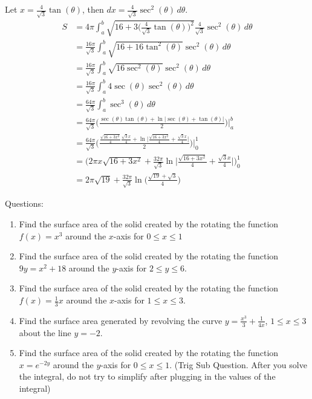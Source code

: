\documentclass[16pt]{article}
\theoremstyle{remark}
\begin{document}
\begin{enumerate}
\begin{mdframed}[style=TheoremFrame]
Let $\displaystyle{x=\frac{4}{\sqrt{3}} \tan(\theta)}$, then $\displaystyle{dx = \frac{4}{\sqrt{3}} \sec^2(\theta)\,d\theta}$.
\begin{align*}
S&= 4\pi \int_a^b \sqrt{16+3\bigg(\frac{4}{\sqrt{3}}\tan(\theta)\bigg)^2}\frac{4}{\sqrt{3}} \sec^2(\theta)\, d\theta\\
&= \frac{16\pi}{\sqrt{3}} \int_a^b \sqrt{16+16\tan^2(\theta)} \sec^2(\theta) \, d\theta\\
&= \frac{16\pi}{\sqrt{3}} \int_a^b \sqrt{16\sec^2(\theta)} \sec^2(\theta) \, d\theta\\
&= \frac{16\pi}{\sqrt{3}} \int_a^b 4\sec(\theta) \sec^2(\theta) \, d\theta\\
&= \frac{64\pi}{\sqrt{3}}\int_a^b  \sec^3(\theta) \, d\theta\\
&= \frac{64\pi}{\sqrt{3}} \bigg(\frac{\sec(\theta)\tan(\theta) + \ln\big|\sec(\theta)+\tan(\theta)\big|}{2}\bigg) \bigg|_a^b\\
&= \frac{64\pi}{\sqrt{3}} \bigg(\frac{\frac{\sqrt{16+3x^2}}{4}\frac{\sqrt{3}x}{4} + \ln\big|\frac{\sqrt{16+3x^2}}{4}+\frac{\sqrt{3}x}{4}\big|}{2}\bigg) \bigg|_0^1\\
&= \bigg(2\pi x \sqrt{16+3x^2} + \frac{32\pi}{\sqrt{3}} \ln\big|\frac{\sqrt{16+3x^2}}{4}+\frac{\sqrt{3}x}{4}\big|\bigg)_0^1\\
&= 2\pi \sqrt{19} + \frac{32\pi}{\sqrt{3}} \ln\bigg(\frac{\sqrt{19}+\sqrt{3}}{4}\bigg) 
\end{align*}
\end{mdframed}
\end{enumerate}
\newpage
Questions:
\begin{enumerate}

\item Find the surface area of the solid created by the rotating the function $f(x) = x^3$ around the $x$-axis for $0 \leq x \leq 1$
\newpage
\item Find the surface area of the solid created by the rotating the function $9y = x^2+18$ around the $y$-axis for $2 \leq y \leq 6$.
\newpage
\item Find the surface area of the solid created by the rotating the function $f(x) = \frac{1}{3}x$ around the $x$-axis for $1 \leq x \leq 3$.
\newpage
\item Find the surface area generated by revolving the curve $y=\frac{x^3}{3}+\frac{1}{4x}$, $1\leq x \leq 3$ about the line $y=-2$.
\newpage
\item Find the surface area of the solid created by the rotating the function $x = e^{-2y}$ around the $y$-axis for $0 \leq x \leq 1$. (Trig Sub Question. After you solve the integral, do not try to simplify after plugging in the values of the integral)
\newpage
\end{enumerate}
\end{document}

